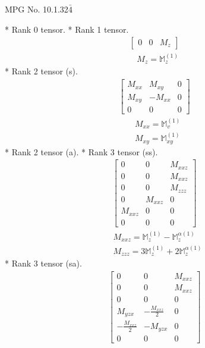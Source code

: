 \documentclass[fleqn,8pt,landscape]{jsarticle}
\begin{document}
\setcounter{MaxMatrixCols}{32}

\renewcommand{\tablename}{Table~}
\renewcommand{\figurename}{Figure~}
\begin{center}
\LARGE
MPG No. 10.1.32\quad$\bar{4}$
\end{center}
* Rank 0 tensor.
* Rank 1 tensor.
\begin{align*}
\begin{bmatrix} 0 & 0 & M_{z} \end{bmatrix}
\end{align*}
\begin{align*}
& M_{z} = \mathbb{M}_{z}^{(1)}
\end{align*}
* Rank 2 tensor (s).
\begin{align*}
\begin{bmatrix} M_{xx} & M_{xy} & 0 \\ M_{xy} & - M_{xx} & 0 \\ 0 & 0 & 0 \end{bmatrix}
\end{align*}
\begin{align*}
& M_{xx} = \mathbb{M}_{v}^{(1)} \\
& M_{xy} = \mathbb{M}_{xy}^{(1)}
\end{align*}
* Rank 2 tensor (a).
* Rank 3 tensor (ss).
\begin{align*}
\begin{bmatrix} 0 & 0 & M_{xxz} \\ 0 & 0 & M_{xxz} \\ 0 & 0 & M_{zzz} \\ 0 & M_{xxz} & 0 \\ M_{xxz} & 0 & 0 \\ 0 & 0 & 0 \end{bmatrix}
\end{align*}
\begin{align*}
& M_{xxz} = \mathbb{M}_{z}^{(1)} - \mathbb{M}_{z}^{\alpha(1)} \\
& M_{zzz} = 3 \mathbb{M}_{z}^{(1)} + 2 \mathbb{M}_{z}^{\alpha(1)}
\end{align*}
* Rank 3 tensor (sa).
\begin{align*}
\begin{bmatrix} 0 & 0 & M_{xxz} \\ 0 & 0 & M_{xxz} \\ 0 & 0 & 0 \\ M_{yzx} & - \frac{M_{xxz}}{2} & 0 \\ - \frac{M_{xxz}}{2} & - M_{yzx} & 0 \\ 0 & 0 & 0 \end{bmatrix}
\end{align*}
\end{document}

